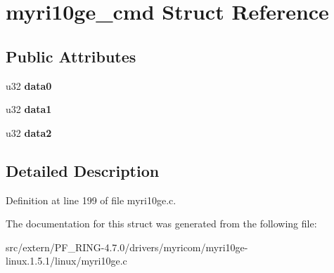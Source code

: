 \hypertarget{structmyri10ge__cmd}{
\section{myri10ge\_\-cmd Struct Reference}
\label{structmyri10ge__cmd}
}
\subsection*{Public Attributes}
\begin{DoxyCompactItemize}
\item 
\hypertarget{structmyri10ge__cmd_a7215af7b94c1180919350c820589b3a8}{
u32 {\bfseries data0}}
\label{structmyri10ge__cmd_a7215af7b94c1180919350c820589b3a8}

\item 
\hypertarget{structmyri10ge__cmd_a646c79f1eb40d6e3130f8205c17153e7}{
u32 {\bfseries data1}}
\label{structmyri10ge__cmd_a646c79f1eb40d6e3130f8205c17153e7}

\item 
\hypertarget{structmyri10ge__cmd_aecb634cb5274c474c4bc9b957a8e72a4}{
u32 {\bfseries data2}}
\label{structmyri10ge__cmd_aecb634cb5274c474c4bc9b957a8e72a4}

\end{DoxyCompactItemize}


\subsection{Detailed Description}


Definition at line 199 of file myri10ge.c.



The documentation for this struct was generated from the following file:\begin{DoxyCompactItemize}
\item 
src/extern/PF\_\-RING-\/4.7.0/drivers/myricom/myri10ge-\/linux.1.5.1/linux/myri10ge.c\end{DoxyCompactItemize}
